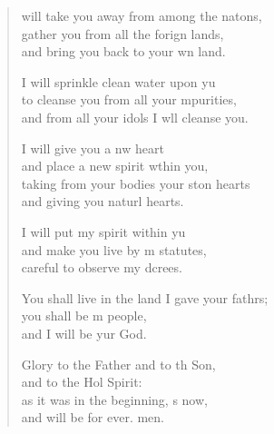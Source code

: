 \settowidth{\versewidth}{You shall live in the land I gave your fathers; +}
\begin{verse}%
  \begin{patverse}
 will take you away from among the nat\pointup{\i}ons,\Flex\\
gather you from all the forign lands,\Med\\
and bring you back to your wn land.

I will sprinkle clean water upon yu\Flex\\
to cleanse you from all your \pointup{\i}mpurities,\Med\\
and from all your idols I w\pointup{\i}ll cleanse you.

I will give you a nw heart\Med\\
and place a new spirit w\pointup{\i}thin you,\\
taking from your bodies your ston hearts\Med\\
and giving you naturl hearts.

I will put my spirit within yu\Flex\\
and make you live by m statutes,\Med\\
careful to observe my dcrees.

You shall live in the land I gave your fathrs;\Flex\\
you shall be m people,\Med\\
and I will be yur God.

Glory to the Father and to th Son,\Med\\
and to the Hol Spirit:\\
as it was in the beginning, \pointup{\i}s now,\Med\\
and will be for ever. men.
  \end{patverse}
  \end{verse}
